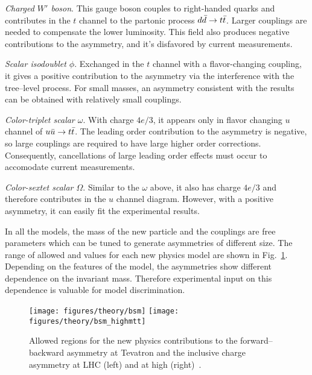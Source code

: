 {\em Charged $W'$ boson}. This gauge boson couples to right-handed
quarks and contributes in the $t$ channel to the partonic process
$d\bar{d}{}\to t\bar{t}{}$. Larger couplings are needed to compensate the
lower \ddbar{} luminosity. This field also produces negative
contributions to the asymmetry, and it's disfavored by current measurements.

{\em Scalar isodoublet $\phi$}.
Exchanged in the $t$ channel with a flavor-changing coupling, it gives
a positive contribution to the asymmetry via the interference with the
tree--level process. For small masses, an asymmetry consistent with the
\afb{} results can be obtained with relatively small couplings.

{\em Color-triplet scalar $\omega$}.
With charge $4e/3$, it appears only in flavor changing $u$ channel of
$u\bar{u}{}\to t\bar{t}{}$. The leading order contribution to the asymmetry
is negative, so large couplings are required to have large higher
order corrections. Consequently, cancellations of large leading order
effects must occur to accomodate current measurements.

{\em Color-sextet scalar $\Omega$}.
Similar to the $\omega$ above, it also has charge $4e/3$ and therefore
contributes in the $u$ channel diagram. However, with a positive
asymmetry, it can easily fit the experimental results.

In all the models, the mass of the new particle and the couplings are
free parameters which can be tuned to generate asymmetries of
different size. The range of allowed \ac{} and \afb{} values for each
new physics model are shown in Fig.~\ref{fig:bsmmodels}. Depending on
the features of the model, the asymmetries show different dependence
on the \ttbar{} invariant mass. Therefore experimental input on this
dependence is valuable for model discrimination. 

\begin{figure}[!htb]
  \centering
  \texttt{[image: figures/theory/bsm]} 
  \texttt{[image: figures/theory/bsm\_highmtt]} 
  \caption{Allowed regions for the new physics contributions to the forward--backward
    asymmetry at Tevatron and the inclusive charge asymmetry at LHC
    (left) and at high \mtt{} (right)~\cite{AguilarSaavedra:2011hz}.}
  \label{fig:bsmmodels}
\end{figure}


